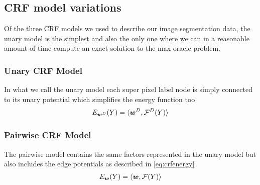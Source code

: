 \subsection{CRF model variations}\label{sec:crfvariations}
Of the three CRF models we used to describe our image segmentation data, the unary model is the simplest and also the only one where we can in a reasonable amount of time compute an exact solution to the max-oracle problem. 
\subsubsection{Unary CRF Model}\label{sec:unaryModel}
In what we call the unary model each super pixel label node is simply connected to its unary potential which simplifies the energy function too
\begin{align} \label{mdl:unary}
E_{\bm{w}^D} (Y) = \langle \bm{w}^D , \mathcal{F}^D(Y) \rangle
\end{align}
\subsubsection{Pairwise CRF Model}\label{sec:pariwiseSimple}
The pairwise model contains the same factors represented in the unary model but also includes the edge potentials as described in \ref{eq:crfenergy}
\begin{align}
E_{\bm{w}} (Y) = \langle \bm{w}, \mathcal{F}(Y) \rangle 
\end{align}
